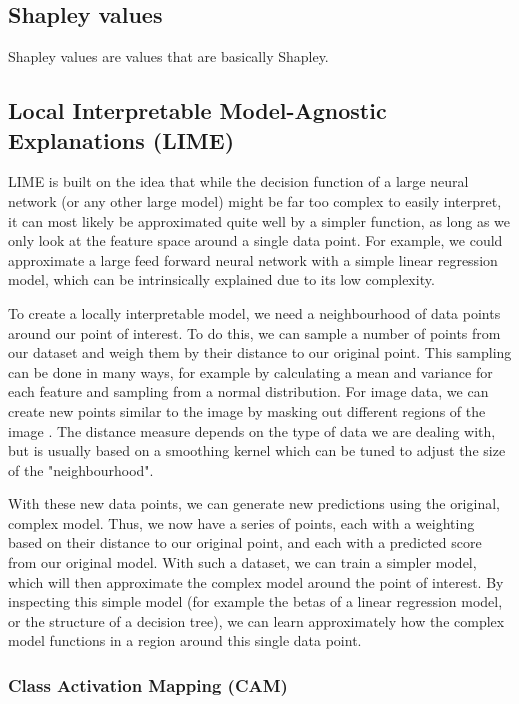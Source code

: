 \documentclass[UKenglish]{uiomasterthesis} %
\theoremstyle{definition}
\begin{document}
\subsection{Shapley values}

Shapley values are values that are basically Shapley.



\subsection{Local Interpretable Model-Agnostic Explanations (LIME)}

LIME \cite{lime} is built on the idea that while the decision function of a large neural network (or any other large model) might be far too complex to easily interpret, it can most likely be approximated quite well by a simpler function, as long as we only look at the feature space around a single data point. For example, we could approximate a large feed forward neural network with a simple linear regression model, which can be intrinsically explained due to its low complexity.

To create a locally interpretable model, we need a neighbourhood of data points around our point of interest. To do this, we can sample a number of points from our dataset and weigh them by their distance to our original point. This sampling can be done in many ways, for example by calculating a mean and variance for each feature and sampling from a normal distribution. For image data, we can create new points similar to the image by masking out different regions of the image \cite{molnar}. The distance measure depends on the type of data we are dealing with, but is usually based on a smoothing kernel which can be tuned to adjust the size of the "neighbourhood".

With these new data points, we can generate new predictions using the original, complex model. Thus, we now have a series of points, each with a weighting based on their distance to our original point, and each with a predicted score from our original model. With such a dataset, we can train a simpler model, which will then approximate the complex model around the point of interest. By inspecting this simple model (for example the betas of a linear regression model, or the structure of a decision tree), we can learn approximately how the complex model functions in a region around this single data point.

\subsubsection{Class Activation Mapping (CAM)}
\end{document}

